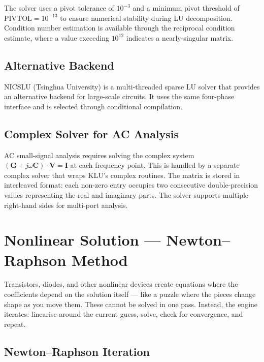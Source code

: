 The solver uses a pivot tolerance of $10^{-3}$ and a minimum pivot threshold of $\text{PIVTOL} = 10^{-13}$ to ensure numerical stability during LU decomposition. Condition number estimation is available through the reciprocal condition estimate, where a value exceeding $10^{12}$ indicates a nearly-singular matrix.

\subsection{Alternative Backend}

NICSLU (Tsinghua University) is a multi-threaded sparse LU solver that provides an alternative backend for large-scale circuits. It uses the same four-phase interface and is selected through conditional compilation.

\subsection{Complex Solver for AC Analysis}

AC small-signal analysis requires solving the complex system $(\mathbf{G} + j\omega\mathbf{C}) \cdot \mathbf{V} = \mathbf{I}$ at each frequency point. This is handled by a separate complex solver that wraps KLU's complex routines. The matrix is stored in interleaved format: each non-zero entry occupies two consecutive double-precision values representing the real and imaginary parts. The solver supports multiple right-hand sides for multi-port analysis.

\section{Nonlinear Solution --- Newton--Raphson Method}

Transistors, diodes, and other nonlinear devices create equations where the coefficients depend on the solution itself --- like a puzzle where the pieces change shape as you move them. These cannot be solved in one pass. Instead, the engine iterates: linearise around the current guess, solve, check for convergence, and repeat.

\subsection{Newton--Raphson Iteration}

